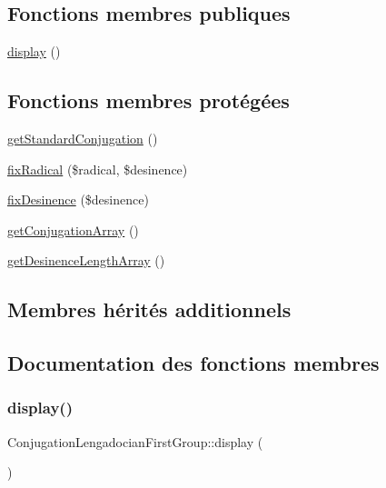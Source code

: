 \subsection*{Fonctions membres publiques}
\begin{DoxyCompactItemize}
\item 
\hyperlink{class_conjugation_lengadocian_first_group_adca5561baef16d3a70d8ee40987bc5c0}{display} ()
\end{DoxyCompactItemize}
\subsection*{Fonctions membres protégées}
\begin{DoxyCompactItemize}
\item 
\hyperlink{class_conjugation_lengadocian_first_group_a3728df26c35bff9d1f74dd0825b30873}{get\+Standard\+Conjugation} ()
\item 
\hyperlink{class_conjugation_lengadocian_first_group_ac9e14d59dc07f35e204efa14bd00d903}{fix\+Radical} (\$radical, \$desinence)
\item 
\hyperlink{class_conjugation_lengadocian_first_group_a7e9cdca67d8ed30db1ef7547c61f38da}{fix\+Desinence} (\$desinence)
\item 
\hyperlink{class_conjugation_lengadocian_first_group_a99becd6debfe143a6577f1ba7b063d58}{get\+Conjugation\+Array} ()
\item 
\hyperlink{class_conjugation_lengadocian_first_group_a292ace5003eeb35711157918cde3c459}{get\+Desinence\+Length\+Array} ()
\end{DoxyCompactItemize}
\subsection*{Membres hérités additionnels}


\subsection{Documentation des fonctions membres}
\hypertarget{class_conjugation_lengadocian_first_group_adca5561baef16d3a70d8ee40987bc5c0}{}\label{class_conjugation_lengadocian_first_group_adca5561baef16d3a70d8ee40987bc5c0} 
\subsubsection{\texorpdfstring{display()}{display()}}
{\footnotesize\ttfamily Conjugation\+Lengadocian\+First\+Group\+::display (\begin{DoxyParamCaption}{ }\end{DoxyParamCaption})}




